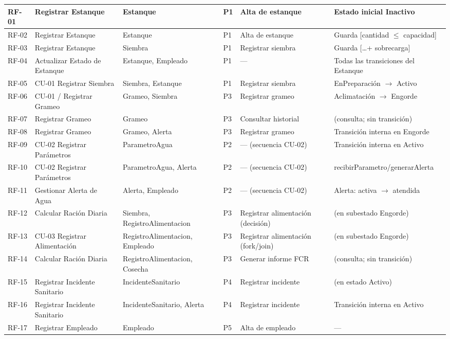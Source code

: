 \documentclass[11pt,a4paper]{article}
\renewcommand{\_}{\textunderscore\allowbreak}
\begin{document}
\begin{landscape}
\begin{longtable}{|p{1.2cm}|p{4.0cm}|p{4.6cm}|p{1.6cm}|p{3.9cm}|p{4.2cm}|}
RF-01 & Registrar Estanque & Estanque & P1 & Alta de estanque & Estado inicial Inactivo\\
\hline
RF-02 & Registrar Estanque & Estanque & P1 & Alta de estanque & Guarda [cantidad $\leq$ capacidad]\\
\hline
RF-03 & Registrar Estanque & Siembra & P1 & Registrar siembra & Guarda [\ldots + sobrecarga]\\
\hline
RF-04 & Actualizar Estado de Estanque & Estanque, Empleado & P1 & --- & Todas las transiciones del Estanque\\
\hline
RF-05 & CU-01 Registrar Siembra & Siembra, Estanque & P1 & Registrar siembra & EnPreparación $\rightarrow$ Activo\\
\hline
RF-06 & CU-01 / Registrar Grameo & Grameo, Siembra & P3 & Registrar grameo & Aclimatación $\rightarrow$ Engorde\\
\hline
RF-07 & Registrar Grameo & Grameo & P3 & Consultar historial & (consulta; sin transición)\\
\hline
RF-08 & Registrar Grameo & Grameo, Alerta & P3 & Registrar grameo & Transición interna en Engorde\\
\hline
RF-09 & CU-02 Registrar Parámetros & ParametroAgua & P2 & --- (secuencia CU-02) & Transición interna en Activo\\
\hline
RF-10 & CU-02 Registrar Parámetros & ParametroAgua, Alerta & P2 & --- (secuencia CU-02) & recibirParametro\allowbreak[fueraDeRango]\allowbreak/generarAlerta\\
\hline
RF-11 & Gestionar Alerta de Agua & Alerta, Empleado & P2 & --- (secuencia CU-02) & Alerta: activa $\rightarrow$ atendida\\
\hline
RF-12 & Calcular Ración Diaria & Siembra, RegistroAlimentacion & P3 & Registrar alimentación (decisión) & (en subestado Engorde)\\
\hline
RF-13 & CU-03 Registrar Alimentación & RegistroAlimentacion, Empleado & P3 & Registrar alimentación (fork/join) & (en subestado Engorde)\\
\hline
RF-14 & Calcular Ración Diaria & RegistroAlimentacion, Cosecha & P3 & Generar informe FCR & (consulta; sin transición)\\
\hline
RF-15 & Registrar Incidente Sanitario & IncidenteSanitario & P4 & Registrar incidente & (en estado Activo)\\
\hline
RF-16 & Registrar Incidente Sanitario & IncidenteSanitario, Alerta & P4 & Registrar incidente & Transición interna en Activo\\
\hline
RF-17 & Registrar Empleado & Empleado & P5 & Alta de empleado & ---\\

\end{longtable}
\end{landscape}
\end{document}
